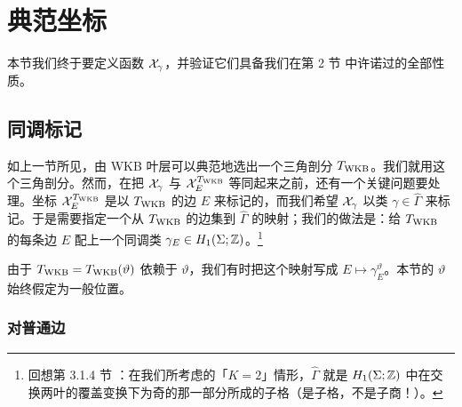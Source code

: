 
\section{典范坐标}\label{sec:darboux-coordinates}

本节我们终于要定义函数 $\mathcal{X}_\gamma$，并验证它们具备我们在第 2 节%
中许诺过的全部性质。

\subsection{同调标记}\label{sec:homology}

如上一节所见，由 WKB 叶层可以典范地选出一个三角剖分 $T_{\rm WKB}$。我们就用这个三角剖分。然而，在把 $\mathcal{X}_\gamma$ 与 $\mathcal{X}^{T_{\rm WKB}}_E$ 等同起来之前，还有一个关键问题要处理。坐标 $\mathcal{X}^{T_{\rm WKB}}_E$ 是以 $T_{\rm WKB}$ 的边 $E$ 来标记的，而我们希望 $\mathcal{X}_\gamma$ 以类 $\gamma\in\hat\Gamma$ 来标记。于是需要指定一个从 $T_{\rm WKB}$ 的边集到 $\hat\Gamma$ 的映射；我们的做法是：给 $T_{\rm WKB}$ 的每条边 $E$ 配上一个同调类 $\gamma_E\in H_1(\Sigma;\mathbb{Z})$。\footnote{回想第 3.1.4 节%
：在我们所考虑的「$K=2$」情形，$\hat\Gamma$ 就是 $H_1(\Sigma;\mathbb{Z})$ 中在交换两叶的覆盖变换下为奇的那一部分所成的子格（是子格，不是子商！）。}

由于 $T_{\rm WKB}=T_{\rm WKB}(\vartheta)$ 依赖于 $\vartheta$，我们有时把这个映射写成 $E\mapsto\gamma^\vartheta_E$。本节的 $\vartheta$ 始终假定为一般位置。

\subsubsection{对普通边}

